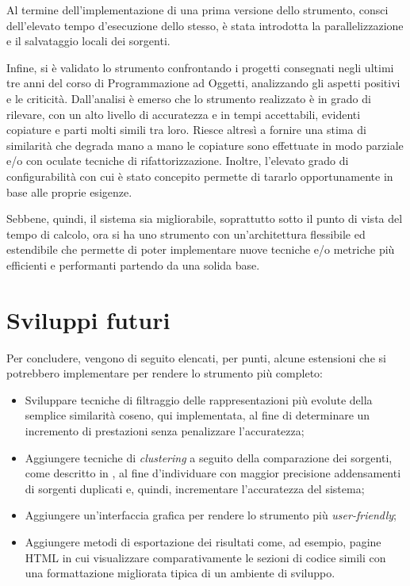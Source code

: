 Al termine dell'implementazione di una prima versione dello strumento, consci dell'elevato tempo d'esecuzione dello stesso, è stata introdotta la parallelizzazione e il salvataggio locali dei sorgenti.

Infine, si è validato lo strumento confrontando i progetti consegnati negli ultimi tre anni del corso di Programmazione ad Oggetti, analizzando gli aspetti positivi e le criticità. 
%
Dall'analisi è emerso che lo strumento realizzato è in grado di rilevare, con un alto livello di accuratezza e in tempi accettabili, evidenti copiature e parti molti simili tra loro.
%
Riesce altresì a fornire una stima di similarità che degrada mano a mano le copiature sono effettuate in modo parziale e/o con oculate tecniche di rifattorizzazione.
%
Inoltre, l'elevato grado di configurabilità con cui è stato concepito permette di tararlo opportunamente in base alle proprie esigenze.

Sebbene, quindi, il sistema sia migliorabile, soprattutto sotto il punto di vista del tempo di calcolo, ora si ha uno strumento con un'architettura flessibile ed estendibile che permette di poter implementare nuove tecniche e/o metriche più efficienti e performanti partendo da una solida base.

\section{Sviluppi futuri}
Per concludere, vengono di seguito elencati, per punti, alcune estensioni che si potrebbero implementare per rendere lo strumento più completo:
\begin{itemize}
    \item Sviluppare tecniche di filtraggio delle rappresentazioni più evolute della semplice similarità coseno, qui implementata, al fine di determinare un incremento di prestazioni senza penalizzare l'accuratezza;
    \item Aggiungere tecniche di \textit{clustering} a seguito della comparazione dei sorgenti, come descritto in \cite{pdectet}, al fine d'individuare con maggior precisione addensamenti di sorgenti duplicati e, quindi, incrementare l'accuratezza del sistema;
    \item Aggiungere un'interfaccia grafica per rendere lo strumento più \textit{user-friendly};
    \item Aggiungere metodi di esportazione dei risultati come, ad esempio, pagine HTML in cui visualizzare comparativamente le sezioni di codice simili con una formattazione migliorata tipica di un ambiente di sviluppo.
\end{itemize}
